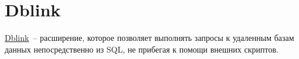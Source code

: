 \section{Dblink}

\href{https://www.postgresql.org/docs/current/static/dblink.html}{Dblink}~-- расширение, которое позволяет выполнять запросы к удаленным базам данных непосредственно из SQL, не прибегая к помощи внешних скриптов.